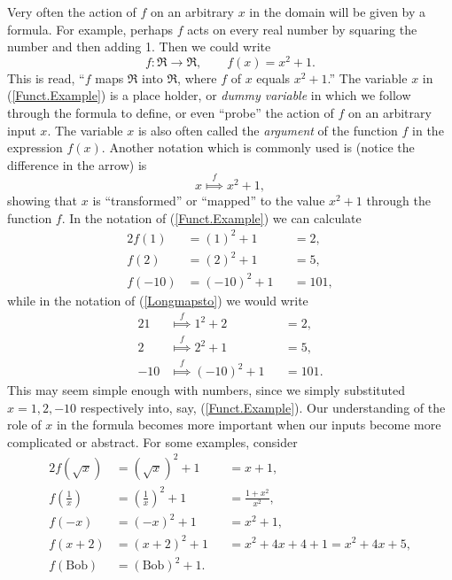 Very often the action of $f$ on an arbitrary $x$ in the
domain will be given by a formula.  For example, perhaps
$f$ acts on every real number by squaring the number and
then adding 1.  Then we could write
\begin{equation}
f:\Re\longrightarrow\Re,\qquad f(x)=x^2+1.\label{Funct.Example}
\end{equation}
This is read, ``$f$ maps $\Re$ into $\Re$, where $f$ of $x$
equals $x^2+1$.''
The variable $x$ in (\ref{Funct.Example})
is a place holder, or {\it dummy variable} in which we follow
through the formula to define, or even ``probe'' the action
of $f$ on an arbitrary input $x$.\footnotemark
The variable $x$ is also often called the {\it argument} of
the function $f$ in the expression $f(x)$.
Another notation which is commonly used is (notice the
difference in the arrow) is 
\begin{equation}x\overset{f}{\Longmapsto}x^2+1,\label{Longmapsto}\end{equation}
showing that $x$ is ``transformed'' or ``mapped'' to the
value $x^2+1$ through the function $f$.  In the notation
of (\ref{Funct.Example}) we can calculate
\begin{alignat*}{2}
f(1)&=(1)^2+1&&=2,\\
f(2)&=(2)^2+1&&=5,\\
f(-10)&=(-10)^2+1&&=101,
\end{alignat*}
while in the notation of (\ref{Longmapsto}) we would write
\begin{alignat*}{2}
1&\overset{f}{\Longmapsto}1^2+2&&=2,\\
2&\overset{f}{\Longmapsto}2^2+1&&=5,\\
-10&\overset{f}{\Longmapsto}(-10)^2+1&&=101.
\end{alignat*}
This may seem simple enough with numbers, since we simply 
substituted $x=1, 2, -10$ respectively into, say,  (\ref{Funct.Example}).
Our understanding of the role of $x$ in the formula
becomes more important when our inputs become
more complicated or abstract.  For some examples, consider
\begin{alignat*}{2}
f\left(\sqrt{x}\right)&=\left(\sqrt{x}\right)^2+1&&=x+1,\\
f\left(\frac1x\right)&=\left(\frac1x\right)^2+1&&=\frac{1+x^2}{x^2},\\
f(-x)&=(-x)^2+1&&=x^2+1,\\
f(x+2)&=(x+2)^2+1&&=x^2+4x+4+1=x^2+4x+5,\\
f(\text{Bob})&=(\text{Bob})^2+1.\end{alignat*}
